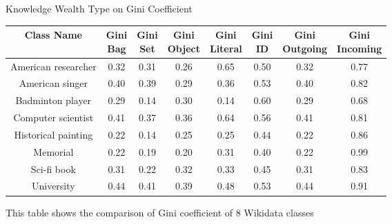 \begin{center}
    \small
    \begin{threeparttable}
    \caption{Knowledge Wealth Type on Gini Coefficient}
    \label{table:gini-coef}
    \begin{tabular}{c | c c | c c c | c c} 
    
    \toprule
        Class Name & \CellWithForceBreak{Gini \\ Bag} & \CellWithForceBreak{Gini \\ Set} & \CellWithForceBreak{Gini \\ Object} & \CellWithForceBreak{Gini \\ Literal} & \CellWithForceBreak{Gini \\ ID} & \CellWithForceBreak{Gini \\ Outgoing} & \CellWithForceBreak{Gini \\ Incoming} \\ [0.5ex] 
    \midrule
        American researcher & 0.32 & 0.31 & 0.26 & 0.65 & 0.50 & 0.32 & 0.77 \\
        American singer & 0.40 & 0.39 & 0.29 & 0.36 & 0.53 & 0.40 & 0.82 \\
        Badminton player & 0.29 & 0.14 & 0.30 & 0.14 & 0.60 & 0.29 & 0.68 \\
        Computer scientist & 0.41 & 0.37 & 0.36 & 0.64 & 0.56 & 0.41 & 0.81 \\
        Historical painting & 0.22 & 0.14 & 0.25 & 0.25 & 0.44 & 0.22 & 0.86 \\
        Memorial & 0.22 & 0.19 & 0.20 & 0.31 & 0.40 & 0.22 & 0.99 \\
        Sci-fi book & 0.31 & 0.22 & 0.32 & 0.33 & 0.45 & 0.31 & 0.83 \\
        University & 0.44 & 0.41 & 0.39 & 0.48 & 0.53 & 0.44 & 0.91 \\
        [1ex]
    \bottomrule
    \end{tabular}
    \begin{tablenotes}
        \footnotesize
        \item{This table shows the comparison of Gini coefficient of 8 Wikidata classes}
    \end{tablenotes}
    \end{threeparttable}
\end{center}